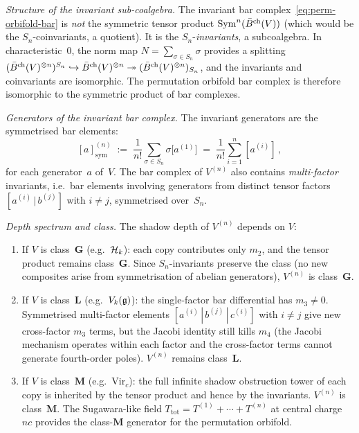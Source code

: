 \begin{computation}
\smallskip
\noindent
\emph{Structure of the invariant sub-coalgebra.}
The invariant bar complex~\eqref{eq:perm-orbifold-bar}
is \emph{not} the symmetric tensor product
$\mathrm{Sym}^n(\bar{B}^{\mathrm{ch}}(V))$ (which would be the
$S_n$-coinvariants, a quotient). It is the
$S_n$-\emph{invariants}, a subcoalgebra. In
characteristic~$0$, the norm map
$N = \sum_{\sigma \in S_n} \sigma$ provides a splitting
$(\bar{B}^{\mathrm{ch}}(V)^{\otimes n})^{S_n}
\hookrightarrow \bar{B}^{\mathrm{ch}}(V)^{\otimes n}
\twoheadrightarrow (\bar{B}^{\mathrm{ch}}(V)^{\otimes n})_{S_n}$,
and the invariants and coinvariants are isomorphic. The
permutation orbifold bar complex is therefore isomorphic
to the symmetric product of bar complexes.

\smallskip
\noindent
\emph{Generators of the invariant bar complex.}
The invariant generators are the symmetrised
bar elements:
\begin{equation}\label{eq:perm-bar-generators}
[a]_{\mathrm{sym}}^{(n)}
\;:=\;
\frac{1}{n!}\sum_{\sigma \in S_n}
\sigma\bigl[a^{(1)}\bigr]
\;=\;
\frac{1}{n!}\sum_{i=1}^{n}
[a^{(i)}]\,,
\end{equation}
for each generator~$a$ of~$V$.
The bar complex of $V^{(n)}$ also contains
\emph{multi-factor} invariants, i.e.\ bar elements
involving generators from distinct tensor factors
$[a^{(i)} \,|\, b^{(j)}]$ with $i \ne j$, symmetrised
over~$S_n$.

\smallskip
\noindent
\emph{Depth spectrum and class.}
The shadow depth of $V^{(n)}$ depends on $V$:
\begin{enumerate}[label=\textup{(\roman*)},nosep]
\item If $V$ is class~$\mathbf{G}$ (e.g.\ $\mathcal{H}_k$):
 each copy contributes only $m_2$, and the tensor
 product remains class~$\mathbf{G}$. Since
 $S_n$-invariants preserve the class (no new composites
 arise from symmetrisation of abelian generators),
 $V^{(n)}$ is class~$\mathbf{G}$.

\item If $V$ is class~$\mathbf{L}$ (e.g.\ $V_k(\mathfrak{g})$):
 the single-factor bar differential has $m_3 \ne 0$.
 Symmetrised multi-factor elements
 $[a^{(i)} \,|\, b^{(j)} \,|\, c^{(i)}]$ with
 $i \ne j$ give new cross-factor $m_3$ terms, but
 the Jacobi identity still kills $m_4$ (the Jacobi
 mechanism operates within each factor and the cross-factor
 terms cannot generate fourth-order poles).
 $V^{(n)}$ remains class~$\mathbf{L}$.

\item If $V$ is class~$\mathbf{M}$
 (e.g.\ $\mathrm{Vir}_c$):
 the full infinite shadow obstruction tower of each copy is
 inherited by the tensor product and hence by the
 invariants. $V^{(n)}$ is class~$\mathbf{M}$.
 The Sugawara-like field
 $T_{\mathrm{tot}} = T^{(1)} + \cdots + T^{(n)}$
 at central charge~$nc$ provides the class-$\mathbf{M}$
 generator for the permutation orbifold.
\end{enumerate}


\end{computation}
